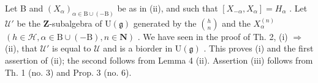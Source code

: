 Let B and \((X_{\alpha})_{\alpha\in\mathrm{B}\cup(-\mathrm{B})}\) be as in (ii), and such that \([X_{-\alpha},X_{\alpha}]=H_{\alpha}\) . Let \(\mathcal{U}'\) be the \(\mathbf{Z}\)-subalgebra of \(\mathrm{U}(\mathfrak{g})\) generated by the \(\binom{h}{n}\) and the \(X_{\alpha}^{(n)}\) \((h\in\mathcal{H},\alpha\in\mathrm{B}\cup(-\mathrm{B}),n\in\mathbf{N})\) . We have seen in the proof of Th. 2, (i) \(\Longrightarrow\) (ii), that \(\mathcal{U}'\) is equal to \(\mathcal{U}\) and is a biorder in \(\mathrm{U}(\mathfrak{g})\) . This proves (i) and the first assertion of (ii); the second follows from Lemma 4 (ii). Assertion (iii) follows from Th. 1 (no. 3) and Prop. 3 (no. 6).

